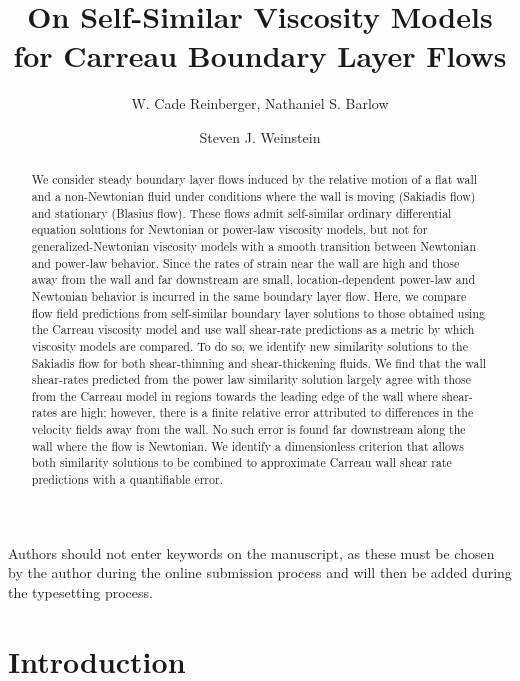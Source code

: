 \documentclass[lineno]{JFM-FLM_Au}
\title{On Self-Similar Viscosity Models for Carreau Boundary Layer Flows}
\author{W. Cade Reinberger\aff{1}, Nathaniel S. Barlow\aff{1} \and Steven J. Weinstein\aff{1, 2}}
\affiliation{\aff{1} Rochester Institute of Technology, School of Mathematics and Statistics, Rochester, NY, 14623, USA \aff{2} Rochester Institute of Technology, Department of Chemical Engineering, Rochester, NY, 14623, USA}
\begin{document}
\maketitle

\begin{abstract}
   We consider steady boundary layer flows induced by the relative motion of a flat wall and a non-Newtonian fluid under conditions where the wall is moving (Sakiadis flow) and stationary (Blasius flow). These flows admit self-similar ordinary differential equation solutions for Newtonian or power-law viscosity models, but not for generalized-Newtonian viscosity models with a smooth transition between Newtonian and power-law behavior. Since the rates of strain near the wall are high and those away from the wall and far downstream are small, location-dependent power-law and Newtonian behavior is incurred in the same boundary layer flow. Here, we compare flow field predictions from self-similar boundary layer solutions to those obtained using the Carreau viscosity model and use wall shear-rate predictions as a metric by which viscosity models are compared. To do so, we identify new similarity solutions to the Sakiadis flow for both shear-thinning and shear-thickening fluids. We find that the wall shear-rates predicted from the power law similarity solution largely agree with those from the Carreau model in regions towards the leading edge of the wall where shear-rates are high; however, there is a finite relative error attributed to differences in the velocity fields away from the wall. No such error is found far downstream along the wall where the flow is Newtonian. We identify a dimensionless criterion that allows both similarity solutions to be combined to approximate Carreau wall shear rate predictions with a quantifiable error.
\end{abstract}

\begin{keywords}
Authors should not enter keywords on the manuscript, as these must be chosen by the author during the online submission process and will then be added during the typesetting process.
\end{keywords}

\section{Introduction}
\end{document}
